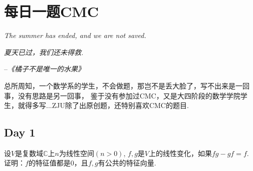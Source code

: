 
\chapter{每日一题CMC}

\begin{introduction}
	\item \emph{The summer has ended, and we are not saved.}
	\item \emph{夏天已过，我们还未得救.}
	\item \quad \quad \quad \quad --\emph{《橘子不是唯一的水果》}
\end{introduction}

总所周知，一个数学系的学生，不会做题，那岂不是丢大脸了，写不出来是一回事，没有思路是另一回事，
鉴于没有参加过CMC，又是大四阶段的数学学院学生，就得多写...ZJU除了出原创题，还特别喜欢CMC的题目.

\section*{Day 1}

\begin{ex}[CMC 1]
	设$V$是复数域$\mathbb{C}$上$n$为线性空间$(n > 0)$, $f,g$是$V$上的线性变化，如果$fg - gf = f$.
	证明：$f$的特征值都是0，且$f,g$有公共的特征向量.
\end{ex}

